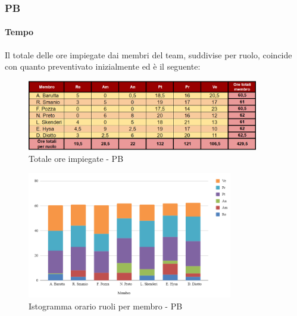 \vspace{0.3cm}

\subsubsection{PB}

\paragraph{Tempo}
Il totale delle ore impiegate dai membri del team, suddivise per ruolo, coincide con quanto preventivato inizialmente ed è il seguente:

\begin{figure}[H]
    \centering
    \includegraphics[width=0.9\textwidth]{../Images/riepilogoPBOreMembro.png}
    \caption{Totale ore impiegate - PB}
    \label{fig:Tot_orePB}
\end{figure}

\vspace{0.6cm}

\begin{figure}[H]
    \centering
    \includegraphics[width=0.8\textwidth]{../Images/graficoOrarioRuoloPB.png}
    \caption{Istogramma orario ruoli per membro - PB}
    \label{fig:GraficoOrePB}
\end{figure}

